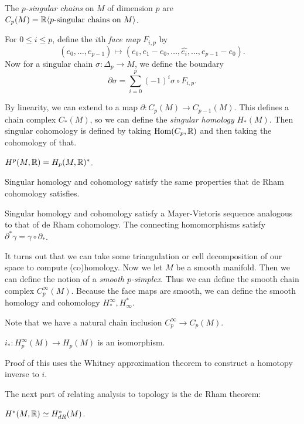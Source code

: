 \documentclass[twoside, 10pt]{article}
\begin{document}
    \begin{defn}
        The \textit{$p$-singular chains} on $M$ of dimension $p$ are $C_p(M) = \mathbb{R} \langle p\text{-singular chains on }M\rangle$.
    \end{defn}

    For $0 \leq i \leq p$, define the $i$th \textit{face map} $F_{i,p}$ by 
    \[(e_0, \ldots, e_{p-1}) \mapsto (e_0, e_1-e_0, \ldots, \widehat{e_i}, \ldots, e_{p-1}-e_0).\] 
    Now for a singular chain $\sigma:\Delta_p \to M$, we define the boundary 
    \[\partial \sigma = \sum_{i=0}^p (-1)^i \sigma \circ F_{i,p}.\]

    By linearity, we can extend to a map $\partial: C_p(M) \to C_{p-1}(M)$. This defines a chain complex $C_*(M)$, so we can define the \textit{singular homology} $H_*(M)$. Then singular cohomology is defined by taking $\operatorname{Hom}(C_p, \mathbb{R})$ and then taking the cohomology of that.

    \begin{prop}
        $H^p(M, \mathbb{R}) = H_p(M, \mathbb{R})^*$.
    \end{prop}

    \begin{prop}
        Singular homology and cohomology satisfy the same properties that de Rham cohomology satisfies.
    \end{prop}

    \begin{thm}
        Singular homology and cohomology satisfy a Mayer-Vietoris sequence analogous to that of de Rham cohomology. The connecting homomorphisms satisfy $\partial^* \gamma = \gamma \circ \partial_*$.
    \end{thm}

    It turns out that we can take some triangulation or cell decomposition of our space to compute (co)homology. Now we let $M$ be a smooth manifold. Then we can define the notion of a \textit{smooth $p$-simplex}. Thus we can define the smooth chain complex $C_p^{\infty}(M)$. Because the face maps are smooth, we can define the smooth homology and cohomology $H_*^{\infty}, H_{\infty}^*$.

    Note that we have a natural chain inclusion $C_p^{\infty} \to C_p(M)$.
    \begin{thm}
        $i_*: H_p^{\infty}(M) \to H_p(M)$ is an isomorphism.
    \end{thm}
    Proof of this uses the Whitney approximation theorem to construct a homotopy inverse to $i$.
    
    The next part of relating analysis to topology is the de Rham theorem:
    \begin{thm}[de Rham]
        $H^*(M, \mathbb{R}) \simeq H^*_{dR}(M)$.
    \end{thm}
\end{document}
